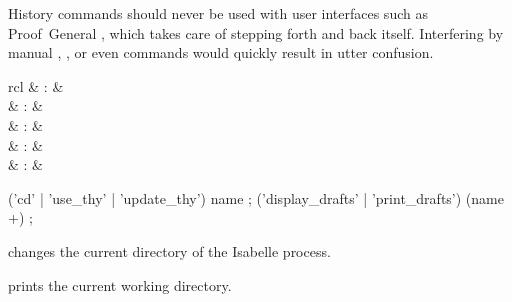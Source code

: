 \begin{isabellebody}
\begin{isamarkuptext}
  \begin{warn}
    History commands should never be used with user interfaces such as
    Proof~General \cite{proofgeneral,Aspinall:TACAS:2000}, which takes
    care of stepping forth and back itself.  Interfering by manual
    \mbox{}, \mbox{}, or even \mbox{}
    commands would quickly result in utter confusion.
  \end{warn}%
\end{isamarkuptext}%
\isamarkuptrue%
%
\isamarkuptrue%
%
\begin{isamarkuptext}%
\begin{matharray}{rcl}
    \mbox{}\isa{{\isachardoublequote}\isactrlsup {\isacharasterisk}{\isachardoublequote}} & : & \isarkeep{\cdot} \\
    \mbox{}\isa{{\isachardoublequote}\isactrlsup {\isacharasterisk}{\isachardoublequote}} & : & \isarkeep{\cdot} \\
    \mbox{}\isa{{\isachardoublequote}\isactrlsup {\isacharasterisk}{\isachardoublequote}} & : & \isarkeep{\cdot} \\
    \mbox{}\isa{{\isachardoublequote}\isactrlsup {\isacharasterisk}{\isachardoublequote}} & : & \isarkeep{\cdot} \\
    \mbox{}\isa{{\isachardoublequote}\isactrlsup {\isacharasterisk}{\isachardoublequote}} & : & \isarkeep{\cdot} \\
  \end{matharray}

  \begin{rail}
    ('cd' | 'use\_thy' | 'update\_thy') name
    ;
    ('display\_drafts' | 'print\_drafts') (name +)
    ;
  \end{rail}

  \begin{descr}

  \item [\mbox{\isa{\isacommand{cd}}}~\isa{path}] changes the current directory
  of the Isabelle process.

  \item [\mbox{\isa{\isacommand{pwd}}}] prints the current working directory.


\end{descr}
\end{isamarkuptext}
\end{isabellebody}
